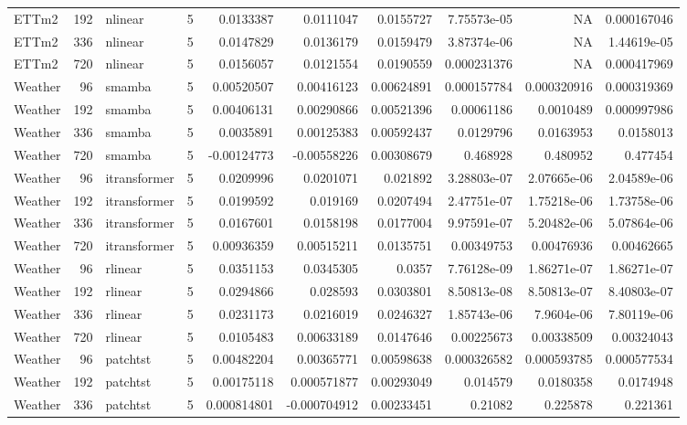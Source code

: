 \begin{longtable}{lrllrrrrrr}
ETTm2 & 192 & nlinear & 5 & 0.0133387 & 0.0111047 & 0.0155727 & 7.75573e-05 & NA & 0.000167046 \\
ETTm2 & 336 & nlinear & 5 & 0.0147829 & 0.0136179 & 0.0159479 & 3.87374e-06 & NA & 1.44619e-05 \\
ETTm2 & 720 & nlinear & 5 & 0.0156057 & 0.0121554 & 0.0190559 & 0.000231376 & NA & 0.000417969 \\
Weather & 96 & smamba & 5 & 0.00520507 & 0.00416123 & 0.00624891 & 0.000157784 & 0.000320916 & 0.000319369 \\
Weather & 192 & smamba & 5 & 0.00406131 & 0.00290866 & 0.00521396 & 0.00061186 & 0.0010489 & 0.000997986 \\
Weather & 336 & smamba & 5 & 0.0035891 & 0.00125383 & 0.00592437 & 0.0129796 & 0.0163953 & 0.0158013 \\
Weather & 720 & smamba & 5 & -0.00124773 & -0.00558226 & 0.00308679 & 0.468928 & 0.480952 & 0.477454 \\
Weather & 96 & itransformer & 5 & 0.0209996 & 0.0201071 & 0.021892 & 3.28803e-07 & 2.07665e-06 & 2.04589e-06 \\
Weather & 192 & itransformer & 5 & 0.0199592 & 0.019169 & 0.0207494 & 2.47751e-07 & 1.75218e-06 & 1.73758e-06 \\
Weather & 336 & itransformer & 5 & 0.0167601 & 0.0158198 & 0.0177004 & 9.97591e-07 & 5.20482e-06 & 5.07864e-06 \\
Weather & 720 & itransformer & 5 & 0.00936359 & 0.00515211 & 0.0135751 & 0.00349753 & 0.00476936 & 0.00462665 \\
Weather & 96 & rlinear & 5 & 0.0351153 & 0.0345305 & 0.0357 & 7.76128e-09 & 1.86271e-07 & 1.86271e-07 \\
Weather & 192 & rlinear & 5 & 0.0294866 & 0.028593 & 0.0303801 & 8.50813e-08 & 8.50813e-07 & 8.40803e-07 \\
Weather & 336 & rlinear & 5 & 0.0231173 & 0.0216019 & 0.0246327 & 1.85743e-06 & 7.9604e-06 & 7.80119e-06 \\
Weather & 720 & rlinear & 5 & 0.0105483 & 0.00633189 & 0.0147646 & 0.00225673 & 0.00338509 & 0.00324043 \\
Weather & 96 & patchtst & 5 & 0.00482204 & 0.00365771 & 0.00598638 & 0.000326582 & 0.000593785 & 0.000577534 \\
Weather & 192 & patchtst & 5 & 0.00175118 & 0.000571877 & 0.00293049 & 0.014579 & 0.0180358 & 0.0174948 \\
Weather & 336 & patchtst & 5 & 0.000814801 & -0.000704912 & 0.00233451 & 0.21082 & 0.225878 & 0.221361 \\

\end{longtable}

